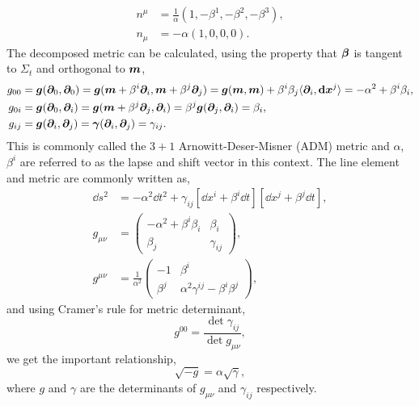 \begin{align}
n^\mu &=  \frac{1}{\alpha}\left( 1,-\beta^1,-\beta^2,-\beta^3\right),\\
n_\mu &= -\alpha\left( 1,0,0,0\right).
\end{align}
The decomposed metric can be calculated, using the property that $\boldsymbol{\beta}$ is tangent to $\Sigma_t$ and orthogonal to $\boldsymbol{m}$,
\begin{align}
g_{00} &= \boldsymbol{g}(\boldsymbol{\partial}_0,\boldsymbol{\partial}_0) = \boldsymbol{g}(\boldsymbol{m} + \beta^i \boldsymbol{\partial}_i,\boldsymbol{m} + \beta^j\boldsymbol{\partial}_j) = \boldsymbol{g}(\boldsymbol{m},\boldsymbol{m}) + \beta^i \beta_j \langle \boldsymbol{\partial}_i,{\boldsymbol{\mathrm{d}}} \boldsymbol{x}^j \rangle = -\alpha^2 + \beta^i \beta_i ,\\
 g_{0i} &= \boldsymbol{g} (\boldsymbol{\partial}_0,\boldsymbol{\partial}_i) =  \boldsymbol{g}(\boldsymbol{m} + \beta^j \boldsymbol{\partial}_j, \boldsymbol{\partial}_i) =   \beta^j\boldsymbol{g}( \boldsymbol{\partial}_j, \boldsymbol{\partial}_i) = \beta_i,\\
 g_{ij} &= \boldsymbol{g}(\boldsymbol{\partial}_i,\boldsymbol{\partial}_j) = \boldsymbol{\gamma}(\boldsymbol{\partial}_i,\boldsymbol{\partial}_j) = \gamma_{ij}.
 \end{align}
This is commonly called the $3+1$ Arnowitt-Deser-Misner (ADM) metric and $\alpha$, $\beta^i$ are referred to as the lapse and shift vector in this context. The line element and metric are commonly written as,
\begin{align}
\dd s^2 &= -\alpha^2 \dd t^2 + \gamma_{ij}\left[\dd x^i + \beta^i \dd t\right]\left[\dd x^j + \beta^j \dd t\right],\\
 g_{\mu\nu} &= \begin{pmatrix} -\alpha^2 + \beta^i \beta_i & \beta_i \\ \beta_j & \gamma_{ij} \end{pmatrix},\label{nr:eq:admmetric}\\
  g^{\mu\nu} &= \frac{1}{\alpha^2}\begin{pmatrix} -1  & \beta^i \\ \beta^j & \alpha^2\gamma^{ij} - \beta^i \beta^j \end{pmatrix},
 \end{align}
and using Cramer's rule for metric determinant,
\begin{equation} g^{00} = \frac{\det{\gamma_{ij}}}{\det{g_{\mu\nu}}},\end{equation}
we get the important relationship,
\begin{equation} \sqrt{-g} = \alpha \sqrt{\gamma} ,\label{nr:eq:gay}\end{equation}
where $g$ and $\gamma$ are the determinants of $g_{\mu\nu}$ and $\gamma_{ij}$ respectively.

